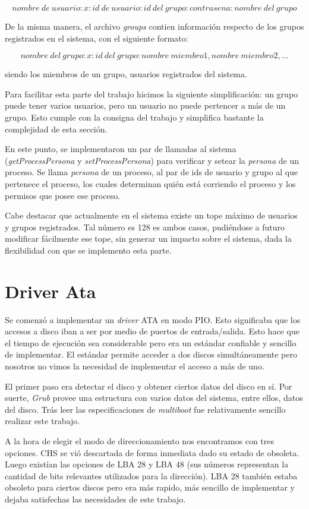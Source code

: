 \documentclass[a4paper,10pt]{article}
\begin{document}
\[nombre\ de\ usuario:x: id\ de\ usuario: id\ del\ grupo: contrasena: nombre\ del\ grupo\]

De la misma manera, el archivo \textit{groups} contien información respecto de los grupos registrados en el sistema, con el siguiente formato:

\[nombre\ del\ grupo:x: id\ del\ grupo:nombre\ miembro1, nombre\ miembro2, ...\]

siendo los miembros de un grupo, usuarios registrados del sistema.

Para facilitar esta parte del trabajo hicimos la siguiente simplificación: un grupo puede tener varios usuarios, pero un usuario no puede pertencer a más de 
un grupo. Esto cumple con la consigna del trabajo y simplifica bastante la complejidad de esta sección.

En este punto, se implementaron un par de llamadas al sistema (\textit{getProcessPersona} y \textit{setProcessPersona}) para verificar y setear la \textit{persona}
de un proceso. Se llama \textit{persona} de un proceso, al par de ids de usuario y grupo al que pertenece el proceso, los cuales determinan quién está corriendo
el proceso y los permisos que posee ese proceso.

Cabe destacar que actualmente en el sistema existe un tope máximo de usuarios y grupos registrados. Tal número es 128 es ambos casos, pudiéndose a futuro modificar
fácilmente ese tope, sin generar un impacto sobre el sistema, dada la flexibilidad con que se implemento esta parte.

\newpage
\section{Driver Ata}
    Se comenzó a implementar un \textit{driver} ATA en modo PIO. Esto significaba que los accesos a disco iban a ser
    por medio de puertos de entrada/salida. Esto hace que el tiempo de ejecución sea considerable pero era un estándar
    confiable y sencillo de implementar.
    El estándar permite acceder a dos discos simultáneamente pero nosotros no vimos la necesidad de implementar el 
    acceso a más de uno.
    
    El primer paso era detectar el disco y obtener ciertos datos del disco en sí. Por suerte, \textit{Grub} provee una estructura
    con varios datos del sistema, entre ellos, datos del disco. Trás leer las especificaciones de \textit{multiboot}
    fue relativamente sencillo realizar este trabajo.

    A la hora de elegir el modo de direccionamiento nos encontramos con tres opciones. CHS se vió descartada de forma
    inmediata dado su estado de obsoleta. Luego existían las opciones de LBA 28 y LBA 48 (sus números representan
    la cantidad de bits relevantes utilizados para la dirección). LBA 28 también estaba obsoleto para ciertos discos
    pero era más rapido, más sencillo de implementar y dejaba satisfechas las necesidades de este trabajo.
\end{document}
